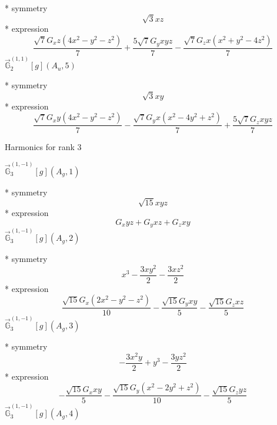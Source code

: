 \documentclass[fleqn,8pt]{jsarticle}
\begin{document}
\noindent\quad ** symmetry
\begin{dmath*}
\sqrt{3} x z
\end{dmath*}
\noindent\quad ** expression
\begin{dmath*}
\frac{\sqrt{7} G_{x} z \left(4 x^{2} - y^{2} - z^{2}\right)}{7} + \frac{5 \sqrt{7} G_{y} x y z}{7} - \frac{\sqrt{7} G_{z} x \left(x^{2} + y^{2} - 4 z^{2}\right)}{7}
\end{dmath*}
\noindent\quad $\vec{\mathbb{G}}_{2}^{(1,1)}[g](A_{u},5)$

\noindent\quad ** symmetry
\begin{dmath*}
\sqrt{3} x y
\end{dmath*}
\noindent\quad ** expression
\begin{dmath*}
\frac{\sqrt{7} G_{x} y \left(4 x^{2} - y^{2} - z^{2}\right)}{7} - \frac{\sqrt{7} G_{y} x \left(x^{2} - 4 y^{2} + z^{2}\right)}{7} + \frac{5 \sqrt{7} G_{z} x y z}{7}
\end{dmath*}

\noindent * Harmonics for rank 3

\noindent\quad $\vec{\mathbb{G}}_{3}^{(1,-1)}[g](A_{g},1)$

\noindent\quad ** symmetry
\begin{dmath*}
\sqrt{15} x y z
\end{dmath*}
\noindent\quad ** expression
\begin{dmath*}
G_{x} y z + G_{y} x z + G_{z} x y
\end{dmath*}
\noindent\quad $\vec{\mathbb{G}}_{3}^{(1,-1)}[g](A_{g},2)$

\noindent\quad ** symmetry
\begin{dmath*}
x^{3} - \frac{3 x y^{2}}{2} - \frac{3 x z^{2}}{2}
\end{dmath*}
\noindent\quad ** expression
\begin{dmath*}
\frac{\sqrt{15} G_{x} \left(2 x^{2} - y^{2} - z^{2}\right)}{10} - \frac{\sqrt{15} G_{y} x y}{5} - \frac{\sqrt{15} G_{z} x z}{5}
\end{dmath*}
\noindent\quad $\vec{\mathbb{G}}_{3}^{(1,-1)}[g](A_{g},3)$

\noindent\quad ** symmetry
\begin{dmath*}
- \frac{3 x^{2} y}{2} + y^{3} - \frac{3 y z^{2}}{2}
\end{dmath*}
\noindent\quad ** expression
\begin{dmath*}
- \frac{\sqrt{15} G_{x} x y}{5} - \frac{\sqrt{15} G_{y} \left(x^{2} - 2 y^{2} + z^{2}\right)}{10} - \frac{\sqrt{15} G_{z} y z}{5}
\end{dmath*}
\noindent\quad $\vec{\mathbb{G}}_{3}^{(1,-1)}[g](A_{g},4)$
\end{document}
